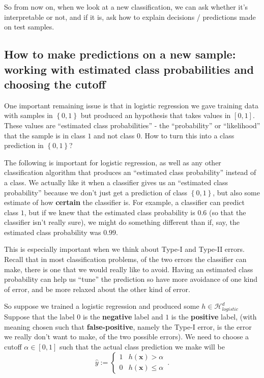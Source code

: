 \documentclass[11pt]{article}
\newcommand{\Hc}{\mathcal{H}}
\newcommand{\VV}[1]{\mathbf{#1}}
\begin{document}
So from now on, when we look at a new classification, we can ask whether it's
interpretable or not, and if it is, ask how to explain decisions / predictions
made on test samples. 

\subsection{How to make predictions on a new sample: working with estimated
class probabilities and choosing the cutoff}

One important remaining issue is that in logistic regression we gave training
data with samples in $\left\{ 0,1 \right\}$ but produced an hypothesis that
takes values in $[0,1]$. These values are ``estimated class probabilities'' -
the ``probability'' or ``likelihood'' that the sample is in class $1$ and not
class $0$. How to turn this into a class prediction in $\left\{ 0,1
\right\}$? 

The following is important for logistic regression, as well as any other
classification algorithm that produces an ``estimated class probability''
instead of a class. We actually like it when a classifier gives us an
``estimated class probability'' because we don't just get a prediction of class
$\left\{ 0,1 \right\}$, but also some estimate of how {\bf certain} the
classifier is. For example, a classifier can predict class $1$, but if we knew
that the estimated class probability is $0.6$ (so that the classifier isn't
really sure), we might do something different than if, say, the estimated class
probability was $0.99$. 

This is especially important when we think about Type-I and Type-II errors.
Recall that in most classification problems, of the two errors the classifier
can make, there is one that we would really like to avoid. Having an estimated
class probability can help us ``tune'' the prediction so have more avoidance of
one kind of error, and be more relaxed about the other kind of error.

So suppose we trained a logistic regression and produced some $h\in\Hc_{logistic}^d$
Suppose that the label $0$ is the {\bf negative} label and $1$ is the {\bf
positive} label, (with meaning chosen such that {\bf false-positive}, namely the
  Type-I error, is the error we really don't want to make, of the two possible
errors). 
We need to choose a cutoff $\alpha\in[0,1]$ such that the actual class
prediction we make will be 
\[\hat{y} := \begin{cases} 1 & h(\VV{x})>\alpha \\ 0 &
      h(\VV{x}) \leq \alpha \end{cases}\,.\] 
\end{document}
